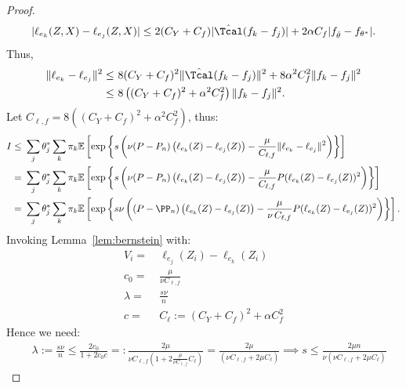 \documentclass[12pt]{extarticle} %
\newcommand{\E}{\mathbb{E}}
\begin{document}
\begin{proof}
\begin{align*}
    |\ell_{e_k}(Z,X) - \ell_{e_j}(Z,X)|\leq 2(C_Y+C_f)|\hat{\Tcal}(f_{k}-f_{j})| + 2\alpha C_f|f_{\hat{\theta}}-f_{\theta^*}|.
\end{align*}
Thus,
\begin{align*}
     \|\ell_{e_k} - \ell_{e_j}\|^2 \leq~& 8(C_Y+C_f)^2\|\hat{\Tcal}(f_{k}-f_{j})\|^2 + 8\alpha^2 C_f^2 \|f_k - f_j\|^2\\
     \leq~& 8\left((C_Y+C_f)^2+\alpha^2C_f^2\right) \|f_k - f_j\|^2.
\end{align*}
Let $C_{\ell,f} = 8\left((C_Y+C_f)^2+\alpha^2C_f^2\right)$, thus:
\begin{align*}
    I \leq~& \sum_{j}\theta_j^* \sum_{k} {\pi_k}\E\left[ \exp\left\{s  \left( \nu(P-P_n) \left(\ell_{e_k}(Z) - \ell_{e_j}(Z)\right) - \frac{\mu}{C_{\ell,f}} \|\ell_{e_k} - \ell_{e_j}\|^2\right)\right\}\right] \\
    =~& \sum_{j}\theta_j^* \sum_{k} {\pi_k}\E\left[ \exp\left\{s  \left( \nu(P-P_n) \left(\ell_{e_k}(Z) - \ell_{e_j}(Z)\right) - \frac{\mu}{C_{\ell,f}} P(\ell_{e_k}(Z) - \ell_{e_j}(Z))^2\right)\right\}\right]\\
    =~& \sum_{j}\theta_j^* \sum_{k}{\pi_k} \E\left[ \exp\left\{s \nu \left((P-\PP_n) \left(\ell_{e_k}(Z) - \ell_{e_j}(Z)\right) - \frac{\mu}{\nu\, C_{\ell,f}} P(\ell_{e_k}(Z) - \ell_{e_j}(Z))^2\right)\right\}\right].
\end{align*}
Invoking Lemma~\ref{lem:bernstein} with:
\begin{align*}
    V_i =~& \ell_{e_j}(Z_i) - \ell_{e_k}(Z_i)\\
    c_0 =~& \frac{\mu}{\nu C_{\ell,f}}\\
    \lambda =~& \frac{s \nu}{n}\\
    c=~& C_{\ell} :=(C_Y+C_f)^2+\alpha C_f^2
\end{align*}
Hence we need:
\begin{align*}
    ~&\lambda := \frac{s\nu}{n} \leq \frac{2c_0}{1 + 2c_0c} =: \frac{2 \mu}{\nu C_{\ell,f} (1 + 2 \frac{\mu}{\nu C_{\ell,f}} C_{\ell})} = \frac{2 \mu}{(\nu C_{\ell,f} + 2 \mu C_{\ell})} \implies s \leq \frac{2 \mu n}{\nu (\nu C_{\ell,f} + 2 \mu C_{\ell})}
\end{align*}
\end{proof}
\end{document}
